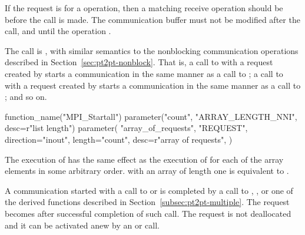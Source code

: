 If the request is for a  operation, then
a matching receive operation should be  before the call is made.  The
communication buffer must not be
modified
after the call, and
until the operation .

The call is , with similar semantics to the nonblocking
communication operations described in
Section~\ref{sec:pt2pt-nonblock}.  That is,
a call to  with a
request created by 
starts a
communication in the same manner as a call to ;
a call to  with a
request created by 
starts a
communication in the same manner as a call to
; and so on.

\begin{mpi-binding}
    function_name("MPI_Startall")
    parameter("count", "ARRAY_LENGTH_NNI", desc=r"list length")
    parameter(
        "array_of_requests",
        "REQUEST",
        direction="inout",
        length="count",
        desc=r"array of requests",
    )
\end{mpi-binding}

The execution of
has the same effect as the execution of
for each of the array elements
in some arbitrary order.
 with an array of length one
is equivalent to .

A communication started with a call to  or
 is
completed by a call to , , or
one of the derived functions described in
Section~\ref{subsec:pt2pt-multiple}.  The request becomes  after
successful completion of such call.  The request is not deallocated
and it can be activated anew by an  or
 call.


